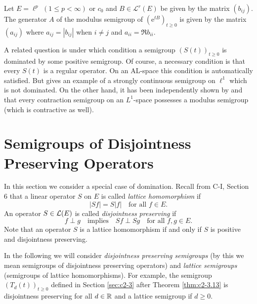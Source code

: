 \begin{example}\label{ex:c2-4.19}
Let $E = \ell^{p}$ $(1 \leq p < \infty)$ or $c_{0}$ and $B \in \mathcal{L}^{r}(E)$ be
given by the matrix $(b_{ij})$.
The generator $A$ of the modulus semigroup of $(\mathrm{e}^{tB})_{t \geq 0}$ is given by the matrix $(a_{ij})$ where $a_{ij} = |b_{ij}|$ when $i \neq j$ and $a_{ii} = \Re  b_{ii}$.
\end{example}

A related question is under which condition a semigroup $(S(t))_{t \geq 0}$ is
dominated by some positive semigroup.
Of course, a necessary condition is that every $S(t)$ is a regular operator.
On an AL-space this condition is automatically satisfied.
But \citet{kipnis:1974} gives an example of a strongly continuous semigroup on $\ell^{1}$ which is not dominated.
On the other hand, it has been independently shown by \citet{kipnis:1974} and
\citet{kubokawa:1975} that every contraction semigroup on an $L^{1}$-space
possesses a modulus semigroup (which is contractive as well).
\section{Semigroups of Disjointness Preserving Operators} \label{sec:c2-5}
In this section we consider a special case of domination. 
Recall from C-I, Section 6 
that a linear operator $S$ on $E$ is called \emph{lattice homomorphism} if
\begin{equation}\label{eq:c2-5.1}
|Sf| = S|f| \quad \text{for all } f \in E.
\end{equation}
An operator $S \in \mathcal{L}(E)$ is called \emph{disjointness preserving} if
\begin{equation}\label{eq:c2-5.2}
f \perp g \quad \text{implies} \quad Sf \perp Sg \quad \text{for all } f,g \in E.
\end{equation}
Note that an operator $S$ is a lattice homomorphism if and only if $S$
is positive and disjointness preserving.

In the following we will consider \emph{disjointness preserving semigroups}
(by this we mean semigroups of disjointness preserving operators) and
\emph{lattice semigroups} (\ie semigroups of lattice homomorphisms). For
example, the semigroup $(T_{d}(t))_{t \geq 0}$ defined in Section \ref{sec:c2-3} after Theorem \ref{thm:c2-3.13}  is disjointness preserving for all $d \in \mathbb{R}$ and a lattice semigroup if $d \geq 0$.

